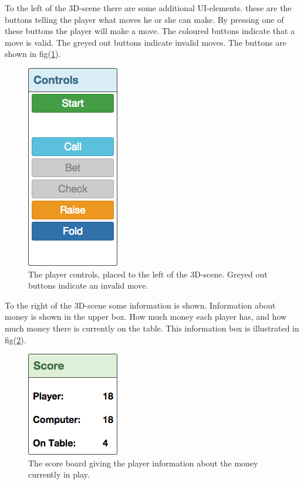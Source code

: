 \documentclass[journal]{vgtc}                %
\begin{document}
To the left of the 3D-scene there are some additional UI-elements. these are the buttons telling the player what moves he or she can make. By pressing one of these buttons the player will make a move. The coloured buttons indicate that a move is valid. The greyed out buttons indicate invalid moves. The buttons are shown in fig(\ref{fig:ui1}).
\begin{figure}[here]
  \begin{center}
    \includegraphics[scale=0.50]{img/ui1.png}
    \caption{\label{fig:ui1} The player controls, placed to the left of the 3D-scene. Greyed out buttons indicate an invalid move.}
  \end{center}
\end{figure}

To the right of the 3D-scene some information is shown. Information about money is shown in the upper box. How much money each player has, and how much money there is currently on the table. This information box is illustrated in fig(\ref{fig:ui2}).
\begin{figure}[here]
  \begin{center}
    \includegraphics[scale=0.50]{img/ui2.png}
    \caption{\label{fig:ui2} The score board giving the player information about the money currently in play.}
  \end{center}
\end{figure}
\end{document}
